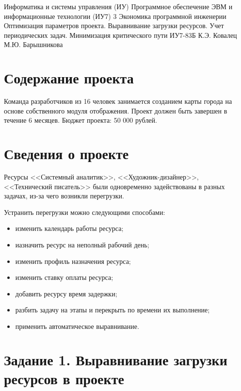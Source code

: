 \documentclass{bmstu}
\begin{document}
\makereporttitle
{Информатика и системы управления (ИУ)}
{Программное обеспечение ЭВМ и информационные технологии (ИУ7)}
{3}
{Экономика программной инженерии}
{Оптимизация параметров проекта. Выравнивание загрузки ресурсов. Учет периодических задач. Минимизация критического пути}
{}
{ИУ7-83Б}
{К.Э. Ковалец}
{М.Ю. Барышникова}


\setcounter{page}{2}

\section*{Содержание проекта}

Команда разработчиков из 16 человек занимается созданием карты города на основе собственного модуля отображения. Проект должен быть завершен в течение 6 месяцев. Бюджет проекта: 50 000 рублей.

\section*{Сведения о проекте}


Ресурсы <<Системный аналитик>>, <<Художник-дизайнер>>, <<Технический писатель>> были одновременно задействованы в разных задачах, из-за чего возникли перегрузки.


\clearpage

Устранить перегрузки можно следующими способами:

\begin{itemize}
    \item изменить календарь работы ресурса;
    \item иазначить ресурс на неполный рабочий день;
    \item изменить профиль назначения ресурса;
    \item изменить ставку оплаты ресурса;
    \item добавить ресурсу время задержки;
    \item разбить задачу на этапы и перекрыть по времени их выполнение;
    \item применить автоматическое выравнивание.
\end{itemize}

\section*{Задание 1. Выравнивание загрузки ресурсов в проекте}
\end{document}
